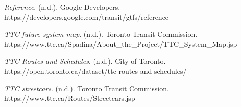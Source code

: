 \documentclass[fontsize=11pt]{article}
\begin{document}
    \hangindent=0.75in
    \textit{Reference}. (n.d.). Google Developers. https://developers.google.com/transit/gtfs/reference

    \hangindent=0.75in
    \textit{TTC future system map}. (n.d.). Toronto Transit Commission. \\
    https://www.ttc.ca/Spadina/About\_the\_Project/TTC\_System\_Map.jsp

    \hangindent=0.75in
    \textit{TTC Routes and Schedules}. (n.d.). City of Toronto. \\
    https://open.toronto.ca/dataset/ttc-routes-and-schedules/

    \hangindent=0.75in
    \textit{TTC streetcars}. (n.d.). Toronto Transit Commission. https://www.ttc.ca/Routes/Streetcars.jsp
\end{document}
